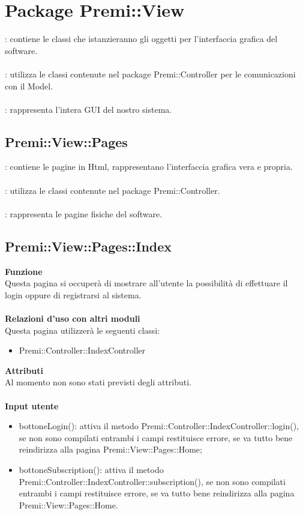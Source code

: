\section{Package Premi::View}{
		\textbf{\tipo}: contiene le classi che istanzieranno gli oggetti per l'interfaccia grafica del software.\\\\
		\textbf{\relaz}: utilizza le classi contenute nel package Premi::Controller per le comunicazioni con il Model.\\\\
		\textbf{\attivita}: rappresenta l'intera GUI del nostro sistema.
		\subsection{Premi::View::Pages}{
			\textbf{\tipo}: contiene le pagine in Html, rappresentano l'interfaccia grafica vera e propria.\\\\
			\textbf{\relaz}: utilizza le classi contenute nel package Premi::Controller.\\\\
			\textbf{\attivita}: rappresenta le pagine fisiche del software.
			}
			\subsection{Premi::View::Pages::Index}{
					\textbf{Funzione}\\
						\indent Questa pagina si occuperà di mostrare all'utente la possibilità di effettuare il login oppure di registrarsi al sistema.\\\\
					\textbf{Relazioni d'uso con altri moduli}\\
						\indent Questa pagina utilizzerà le seguenti classi:
					\begin{itemize}
						\item Premi::Controller::IndexController
					\end{itemize}
					\textbf{Attributi}\\
						\indent Al momento non sono stati previsti degli attributi.\\\\
					\textbf{Input utente}
						\begin{itemize}
						\item bottoneLogin(): attiva il metodo Premi::Controller::IndexController::login(), se non sono compilati entrambi i campi restituisce errore, se va tutto bene reindirizza alla pagina Premi::View::Pages::Home;
						\item bottoneSubscription(): attiva il metodo Premi::Controller::IndexController::\-subscription(), se non sono compilati entrambi i campi restituisce errore, se va tutto bene reindirizza alla pagina Premi::View::Pages::Home.
					\end{itemize}
				}
}
